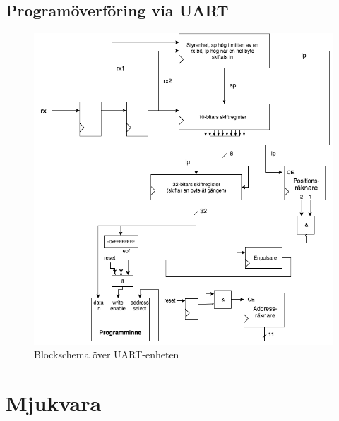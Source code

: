 \documentclass[a4paper,titlepage]{article}
\begin{document}
\subsection{Programöverföring via UART}

\begin{figure}[H] 
	\centering
\includegraphics[width=14cm]{../images/UART.png}
	\caption{Blockschema över UART-enheten\label{uartscheme}}
\end{figure}

\section{Mjukvara}
\end{document}
